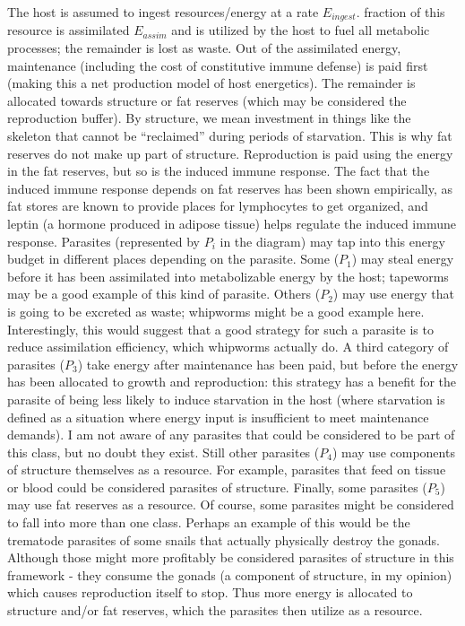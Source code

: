 \documentclass[11pt,reqno,final,pdftex]{amsart}\usepackage[]{graphicx}\usepackage[]{color}
\theoremstyle{plain}
\numberwithin{equation}{part}
\begin{document}
The host is assumed to ingest resources/energy at a rate $E_{ingest}$.
 fraction of this resource is assimilated $E_{assim}$ and is utilized by the host to fuel all metabolic processes; the remainder is lost as waste.
Out of the assimilated energy, maintenance (including the cost of constitutive immune defense) is paid first (making this a net production model of host energetics).
The remainder is allocated towards structure or fat reserves (which may be considered the reproduction buffer).
By structure, we mean investment in things like the skeleton that cannot be ``reclaimed'' during periods of starvation.
This is why fat reserves do not make up part of structure.
Reproduction is paid using the energy in the fat reserves, but so is the induced immune response.
The fact that the induced immune response depends on fat reserves has been shown empirically, as fat stores are known to provide places for lymphocytes to get organized, and leptin (a hormone produced in adipose tissue) helps regulate the induced immune response.
Parasites (represented by $P_i$ in the diagram) may tap into this energy budget in different places depending on the parasite.
Some ($P_1$) may steal energy before it has been assimilated into metabolizable energy by the host; tapeworms may be a good example of this kind of parasite.
Others ($P_2$) may use energy that is going to be excreted as waste; whipworms might be a good example here.
Interestingly, this would suggest that a good strategy for such a parasite is to reduce assimilation efficiency, which whipworms actually do.
A third category of parasites ($P_3$) take energy after maintenance has been paid, but before the energy has been allocated to growth and reproduction: this strategy has a benefit for the parasite of being less likely to induce starvation in the host (where starvation is defined as a situation where energy input is insufficient to meet maintenance demands).
I am not aware of any parasites that could be considered to be part of this class, but no doubt they exist.
Still other parasites ($P_4$) may use components of structure themselves as a resource.
For example, parasites that feed on tissue or blood could be considered parasites of structure.
Finally, some parasites ($P_5$) may use fat reserves as a resource.
Of course, some parasites might be considered to fall into more than one class.
Perhaps an example of this would be the trematode parasites of some snails that actually physically destroy the gonads.
Although those might more profitably be considered parasites of structure in this framework - they consume the gonads (a component of structure, in my opinion) which causes reproduction itself to stop.
Thus more energy is allocated to structure and/or fat reserves, which the parasites then utilize as a resource.
\end{document}
